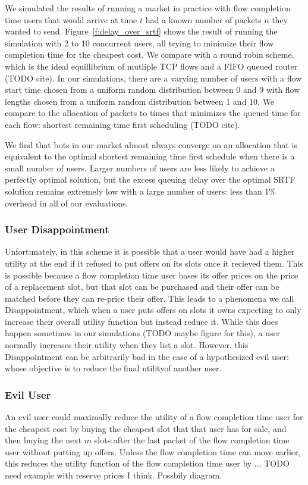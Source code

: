 We simulated the results of running a market in practice with flow completion time users that would arrive at time $t$ had a known number of packets $n$ they wanted to send.
Figure~\ref{f:delay_over_srtf} shows the result of running the simulation with 2 to 10 concurrent users, all trying to minimize their flow completion time for the cheapest cost.
We compare with a round robin scheme, which is the ideal equillibrium of mutliple TCP flows and a FIFO queued router (TODO cite).
In our simulations, there are a varying number of users with a flow start time chosen from a uniform random distribution between 0 and 9 with flow lengths chosen from a uniform random distribution between 1 and 10. We compare to the allocation of packets to times that minimizes the queued time for each flow: shortest remaining time first scheduling (TODO cite).

We find that bots in our market almost always converge on an allocation that is equivalent to the optimal shortest remaining time first schedule when there is a small number of users. Larger numbers of users are less likely to achieve a perfectly optimal solution, but the excess queuing delay over the optimal SRTF solution remains extremely low with a large number of users: less than 1\% overhead in all of our evaluations.

\subsubsection{User Disappointment}
Unfortunately, in this scheme it is possible that a user would have had a higher utility at the end if it refused to put offers on its slots once it recieved them.
This is possible because a flow completion time user bases its offer prices on the price of a replacement slot, but that slot can be purchased and their offer can be matched before they can re-price their offer.
This leads to a phenomena we call Disappointment, which when a user puts offers on slots it owns expecting to only increase their overall utility function but instead reduce it.
While this does happen sometimes in our simulations (TODO maybe figure for this), a user normally increases their utility when they list a slot.
However, this Disappointment can be arbitrarily bad in the case of a hypothesized evil user: whose objective is to reduce the final utilityof another user.
\subsubsection{Evil User}
An evil user could maximally reduce the utility of a flow completion time user for the cheapest cost by buying the cheapest slot that that user has for sale, and then buying the next $m$ slots after the last packet of the flow completion time user without putting up offers. Unless the flow completion time can move earlier, this reduces the utility function of the flow completion time user by ... TODO need example with reserve prices I think. Possbily diagram.

